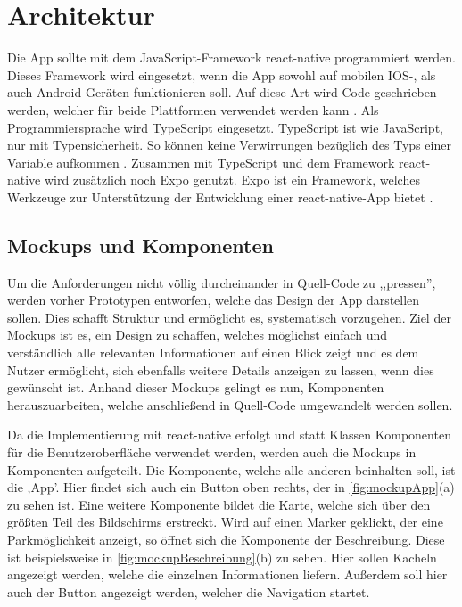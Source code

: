 \chapter{Architektur}

Die App sollte mit dem JavaScript-Framework react-native programmiert werden. Dieses Framework wird eingesetzt, wenn die App sowohl auf mobilen IOS-, als auch Android-Geräten funktionieren soll. Auf diese Art wird Code geschrieben werden, welcher für beide Plattformen verwendet werden kann \cite{whyReactNative}. Als Programmiersprache wird TypeScript eingesetzt. TypeScript ist wie JavaScript, nur mit Typensicherheit. So können keine Verwirrungen bezüglich des Typs einer Variable aufkommen \cite{whyTypeScript}. Zusammen mit TypeScript und dem Framework react-native wird zusätzlich noch Expo genutzt. Expo ist ein Framework, welches Werkzeuge zur Unterstützung der Entwicklung einer react-native-App bietet \cite{whyExpo}. 

\section{Mockups und Komponenten}
Um die Anforderungen nicht völlig durcheinander in Quell-Code zu ,,pressen'', werden vorher Prototypen entworfen, welche das Design der App darstellen sollen. Dies schafft Struktur und ermöglicht es, systematisch vorzugehen. Ziel der Mockups ist es, ein Design zu schaffen, welches möglichst einfach und verständlich alle relevanten Informationen auf einen Blick zeigt und es dem Nutzer ermöglicht, sich ebenfalls weitere Details anzeigen zu lassen, wenn dies gewünscht ist. Anhand dieser Mockups gelingt es nun, Komponenten herauszuarbeiten, welche anschließend in Quell-Code umgewandelt werden sollen.

Da die Implementierung mit react-native erfolgt und statt Klassen Komponenten für die Benutzeroberfläche verwendet werden, werden auch die Mockups in Komponenten aufgeteilt. Die Komponente, welche alle anderen beinhalten soll, ist die ,App'. Hier findet sich auch ein Button oben rechts, der in \autoref{fig:mockupApp}(a) zu sehen ist. Eine weitere Komponente bildet die Karte, welche sich über den größten Teil des Bildschirms erstreckt. Wird auf einen Marker geklickt, der eine Parkmöglichkeit anzeigt, so öffnet sich die Komponente der Beschreibung. Diese ist beispielsweise in \autoref{fig:mockupBeschreibung}(b) zu sehen. Hier sollen Kacheln angezeigt werden, welche die einzelnen Informationen liefern. Außerdem soll hier auch der Button angezeigt werden, welcher die Navigation startet. 

